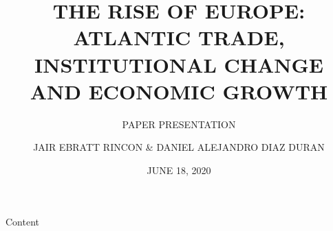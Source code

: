 \documentclass[pdftex,12pt,xcolor=pdftex,table]{beamer}
\theoremstyle{definition}
\theoremstyle{remark}
\numberwithin{equation}{section}
\numberwithin{figure}{section}
\begin{document}
\author[Manuel \& Aprendiendo]{JAIR EBRATT RINCON \& DANIEL ALEJANDRO DIAZ DURAN}
\title{THE RISE OF EUROPE: ATLANTIC TRADE, INSTITUTIONAL CHANGE AND ECONOMIC GROWTH}
\date{JUNE 18, 2020} 
\subtitle{PAPER PRESENTATION}



	\begin{frame}
		\maketitle
	\end{frame}

	\begin{frame}{Content}
		\tableofcontents
	\end{frame}
\end{document}
